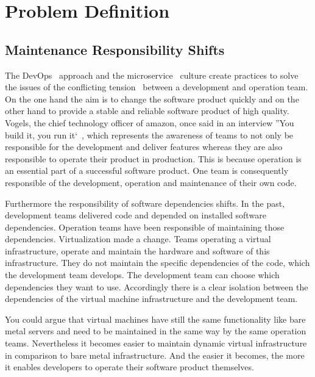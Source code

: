\chapter{Problem Definition}

\section{Maintenance Responsibility Shifts}

The DevOps~\cite{devops_definition} approach and the
microservice~\cite{microservices_fowler} culture create practices to solve the issues of
the conflicting tension~\cite{sre_intro} between a development and operation team. On the
one hand the aim is to change the software product quickly and on the other hand to
provide a stable and reliable software product of high quality. Vogels, the chief
technology officer of amazon, once said in an interview ''You build it, you run
it`~\cite{build_run}, which represents the awareness of teams to not only be responsible
for the development and deliver features whereas they are also responsible to operate
their product in production. This is because operation is an essential part of a
successful software product. One team is consequently responsible of the development,
operation and maintenance of their own code.

Furthermore the responsibility of software dependencies shifts. In the past, development
teams delivered code and depended on installed software dependencies. Operation teams have
been responsible of maintaining those dependencies. Virtualization made a change. Teams
operating a virtual infrastructure, operate and maintain the hardware and software of this
infrastructure. They do not maintain the specific dependencies of the code, which the
development team develops. The development team can choose which dependencies they want to
use. Accordingly there is a clear isolation between the dependencies of the virtual
machine infrastructure and the development team.

You could argue that virtual machines have still the same functionality like bare metal
servers and need to be maintained in the same way by the same operation
teams. Nevertheless it becomes easier to maintain dynamic virtual
infrastructure~\cite{infra_as_code_platforms} in comparison to bare metal
infrastructure. And the easier it becomes, the more it enables developers to operate their
software product themselves.

